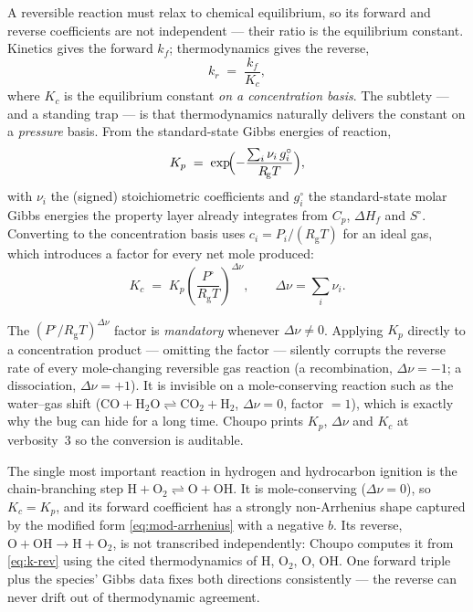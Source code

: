 \documentclass[11pt,a4paper]{article}
\newcommand{\Rgas}{R_{\!\mathrm{g}}}                %
\begin{document}
A reversible reaction must relax to chemical equilibrium, so its
forward and reverse coefficients are not independent --- their ratio
is the equilibrium constant.  Kinetics gives the forward $k_f$;
thermodynamics gives the reverse,
\begin{equation}
    k_r \;=\; \frac{k_f}{K_c},
    \label{eq:k-rev}
\end{equation}
where $K_c$ is the equilibrium constant \emph{on a concentration
basis}.  The subtlety --- and a standing trap --- is that
thermodynamics naturally delivers the constant on a \emph{pressure}
basis.  From the standard-state Gibbs energies of reaction,
\begin{equation}
    K_p \;=\; \exp\!\Bigl(-\frac{\sum_i \nu_i\, g_i^\circ}{\Rgas T}\Bigr),
    \label{eq:Kp}
\end{equation}
with $\nu_i$ the (signed) stoichiometric coefficients and $g_i^\circ$
the standard-state molar Gibbs energies the property layer already
integrates from $C_p$, $\Delta H_f$ and $S^\circ$.  Converting to the
concentration basis uses $c_i = P_i/(\Rgas T)$ for an ideal gas,
which introduces a factor for every net mole produced:
\begin{equation}
    \boxed{\,K_c \;=\; K_p \left(\frac{P^\circ}{\Rgas T}\right)^{\!\Delta\nu},
    \qquad \Delta\nu = \sum_i \nu_i .\,}
    \label{eq:Kc}
\end{equation}

\begin{pitfall}
The $(P^\circ/\Rgas T)^{\Delta\nu}$ factor is \emph{mandatory} whenever
$\Delta\nu \neq 0$.  Applying $K_p$ directly to a concentration product
--- omitting the factor --- silently corrupts the reverse rate of
every mole-changing reversible gas reaction (a recombination,
$\Delta\nu = -1$; a dissociation, $\Delta\nu = +1$).  It is invisible
on a mole-conserving reaction such as the water--gas shift
($\mathrm{CO + H_2O \rightleftharpoons CO_2 + H_2}$, $\Delta\nu = 0$, factor $= 1$), which is
exactly why the bug can hide for a long time.  Choupo prints $K_p$,
$\Delta\nu$ and $K_c$ at verbosity~3 so the conversion is auditable.
\end{pitfall}

\begin{example}
The single most important reaction in hydrogen and hydrocarbon
ignition is the chain-branching step
$\mathrm{H + O_2 \rightleftharpoons O + OH}$.  It is mole-conserving ($\Delta\nu = 0$), so
$K_c = K_p$, and its forward coefficient has a strongly non-Arrhenius
shape captured by the modified form \eqref{eq:mod-arrhenius} with a
negative $b$.  Its reverse, $\mathrm{O + OH \rightarrow H + O_2}$, is not transcribed
independently: Choupo computes it from \eqref{eq:k-rev} using the
cited thermodynamics of $\mathrm{H}$, $\mathrm{O_2}$, $\mathrm{O}$, $\mathrm{OH}$.  One forward
triple plus the species' Gibbs data fixes both directions
consistently --- the reverse can never drift out of thermodynamic
agreement.
\end{example}
\end{document}
